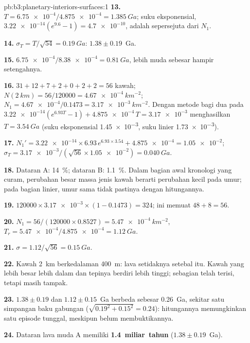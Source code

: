 \begin{solution}{pb:b3:planetary-interiors-surfaces:1}
\textbf{13.} $T = \num{6.75e-4}/\num{4.875e-4} = \qty{1.385}{Ga}$; suku
eksponensial, $\num{3.22e-14}(e^{9.6} - 1) = \num{4.7e-10}$, adalah
sepersejuta dari $N_1$.

\textbf{14.} $\sigma_T = T/\sqrt{54} = \qty{0.19}{Ga}$: $1.38 \pm 0.19$~Ga.

\textbf{15.} $\num{6.75e-4}/\num{8.38e-4} = \qty{0.81}{Ga}$, lebih muda sebesar
hampir setengahnya.

\textbf{16.} $31 + 12 + 7 + 2 + 0 + 2 + 2 = 56$ kawah; $N(\qty{2}{km}) =
56/120000 = \qty{4.67e-4}{km^{-2}}$; $N_1 = \num{4.67e-4}/0.1473 =
\qty{3.17e-3}{km^{-2}}$. Dengan metode bagi dua pada $\num{3.22e-14}(e^{6.93T} - 1) +
\num{4.875e-4}\,T = \num{3.17e-3}$ menghasilkan $T = \qty{3.54}{Ga}$ (suku
eksponensial \num{1.45e-3}, suku linier \num{1.73e-3}).

\textbf{17.} $N_1' = \num{3.22e-14}\times6.93\,e^{6.93\times3.54} +
\num{4.875e-4} = \num{1.05e-2}$; $\sigma_T = \num{3.17e-3}/(\sqrt{56}\times
\num{1.05e-2}) = \qty{0.040}{Ga}$.

\textbf{18.} Dataran A: \qty{14}{\percent}; dataran B: \qty{1.1}{\percent}. Dalam
bagian awal kronologi yang curam, perubahan besar massa jenis kawah
berarti perubahan kecil pada umur; pada bagian linier, umur sama
tidak pastinya dengan hitungannya.

\textbf{19.} $120000\times\num{3.17e-3}\times(1 - 0.1473) = 324$; ini
memuat $48 + 8 = 56$.

\textbf{20.} $N_1 = 56/(120000\times0.8527) = \qty{5.47e-4}{km^{-2}}$,
$T_r = \num{5.47e-4}/\num{4.875e-4} = \qty{1.12}{Ga}$.

\textbf{21.} $\sigma = 1.12/\sqrt{56} = \qty{0.15}{Ga}$.

\textbf{22.} Kawah \qty{2}{km} berkedalaman \qty{400}{m}: lava
setidaknya setebal itu. Kawah yang lebih besar lebih dalam dan tepinya berdiri lebih tinggi;
sebagian telah terisi, tetapi masih tampak.

\textbf{23.} $1.38 \pm 0.19$ dan $1.12 \pm 0.15$~Ga berbeda sebesar \qty{0.26}{Ga},
sekitar satu simpangan baku gabungan ($\sqrt{0.19^2 + 0.15^2} = 0.24$):
hitungannya memungkinkan satu episode tunggal, meskipun belum membuktikannya.

\textbf{24.} Dataran lava muda A memiliki 
\textbf{1.4~miliar~tahun} ($1.38 \pm 0.19$~Ga).
\end{solution}

